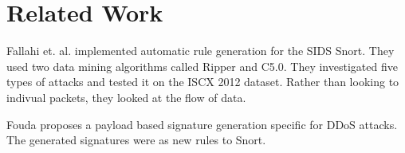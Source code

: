 \section{Related Work}
Fallahi et. al. \cite{Fallahi2016} implemented automatic rule generation for the SIDS Snort. They used two data mining algorithms called Ripper and C5.0. They investigated five types of attacks and tested it on the ISCX 2012 dataset. Rather than looking to indivual packets, they looked at the flow of data.

Fouda \cite{Fouda2017} proposes a payload based signature generation specific for DDoS attacks. The generated signatures were as new rules to Snort. 